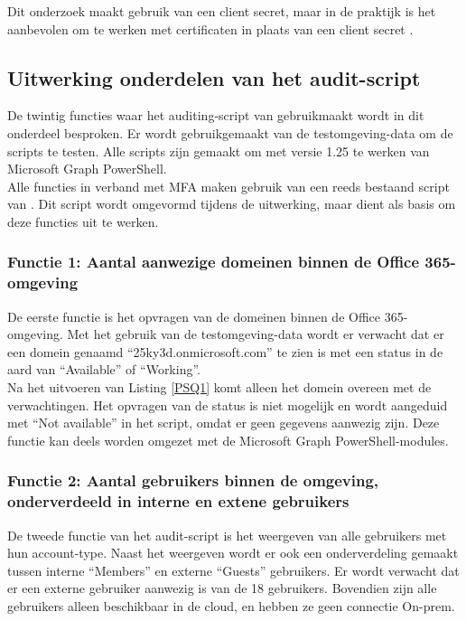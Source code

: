 Dit onderzoek maakt gebruik van een client secret, maar in de praktijk is het aanbevolen om te werken met certificaten in plaats van een client secret \autocite{Terlisten2022}.

\subsection{Uitwerking onderdelen van het audit-script}

De twintig functies waar het auditing-script van gebruikmaakt wordt in dit onderdeel besproken. Er wordt gebruikgemaakt van de testomgeving-data om de scripts te testen. Alle scripts zijn gemaakt om met versie 1.25 te werken van Microsoft Graph PowerShell. \\

Alle functies in verband met \ac{MFA} maken gebruik van een reeds bestaand script van \textcite{Allen2023}. Dit script wordt omgevormd tijdens de uitwerking, maar dient als basis om deze functies uit te werken.

\subsubsection{Functie 1: Aantal aanwezige domeinen binnen de Office 365-omgeving}

De eerste functie is het opvragen van de domeinen binnen de Office 365-omgeving. Met het gebruik van de testomgeving-data wordt er verwacht dat er een domein genaamd “25ky3d.onmicrosoft.com” te zien is met een status in de aard van “Available” of “Working”. \\

Na het uitvoeren van Listing \ref{PSQ1} komt alleen het domein overeen met de verwachtingen. Het opvragen van de status is niet mogelijk en wordt aangeduid met “Not available” in het script, omdat er geen gegevens aanwezig zijn. Deze functie kan deels worden omgezet met de Microsoft Graph PowerShell-modules.

\subsubsection{Functie 2: Aantal gebruikers binnen de omgeving, onderverdeeld in interne en extene gebruikers}

De tweede functie van het audit-script is het weergeven van alle gebruikers met hun account-type. Naast het weergeven wordt er ook een onderverdeling gemaakt tussen interne “Members” en externe “Guests” gebruikers. Er wordt verwacht dat er een externe gebruiker aanwezig is van de 18 gebruikers. Bovendien zijn alle gebruikers alleen beschikbaar in de cloud, en hebben ze geen connectie \ac{On-prem}. \\

